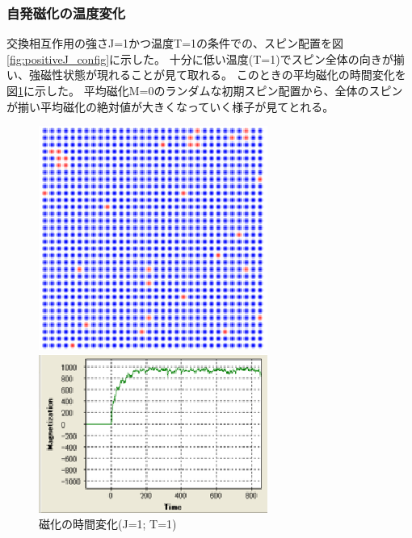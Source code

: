 \documentclass[11pt,a4]{jarticle}
\begin{document}
\subsubsection{自発磁化の温度変化}
交換相互作用の強さJ=1かつ温度T=1の条件での、スピン配置を図\ref{fig:positiveJ_config}に示した。
十分に低い温度(T=1)でスピン全体の向きが揃い、強磁性状態が現れることが見て取れる。
このときの平均磁化の時間変化を図\ref{fig:positiveJ_transition}に示した。
平均磁化M=0のランダムな初期スピン配置から、全体のスピンが揃い平均磁化の絶対値が大きくなっていく様子が見てとれる。
\begin{figure}[htbp]
 \begin{minipage}{0.45\hsize}
  \begin{center}
   \includegraphics[width=0.9\hsize]{positiveJ_config.eps}
  \end{center}
  \caption{スピン配置(J=1; T=1)}
  \label{fig:positiveJ_config}
 \end{minipage}
 \begin{minipage}{0.55\hsize}
  \begin{center}
   \includegraphics[width=0.9\hsize]{positiveJ_transition.eps}
  \end{center}
  \caption{磁化の時間変化(J=1; T=1)}
  \label{fig:positiveJ_transition}
 \end{minipage}
\end{figure}
\end{document}
